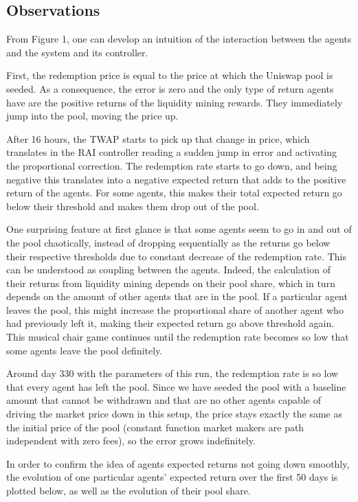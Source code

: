 \documentclass{article}
\begin{document}
    \subsection{Observations}

    From Figure 1, one can develop an intuition of the interaction between the agents and the system and its controller. 
    
    First, the redemption price is equal to the price at which the Uniswap pool is seeded. As a consequence, the error is zero and the only type of return agents have are the positive returns of the liquidity mining rewards. They immediately jump into the pool, moving the price up. 
    
    After 16 hours, the TWAP starts to pick up that change in price, which translates in the RAI controller reading a sudden jump in error and activating the proportional correction. The redemption rate starts to go down, and being negative this translates into a negative expected return that adds to the positive return of the agents. For some agents, this makes their total expected return go below their threshold and makes them drop out of the pool. 

    One surprising feature at first glance is that some agents seem to go in and out of the pool chaotically, instead of dropping sequentially as the returns go below their respective thresholds due to constant decrease of the redemption rate. This can be understood as coupling between the agents. Indeed, the calculation of their returns from liquidity mining depends on their pool share, which in turn depends on the amount of other agents that are in the pool. If a particular agent leaves the pool, this might increase the proportional share of another agent who had previously left it, making their expected return go above threshold again. This musical chair game continues until the redemption rate becomes so low that some agents leave the pool definitely. 
    
    Around day 330 with the parameters of this run, the redemption rate is so low that every agent has left the pool. Since we have seeded the pool with a baseline amount that cannot be withdrawn and that are no other agents capable of driving the market price down in this setup, the price stays exactly the same as the initial price of the pool (constant function market makers are path independent with zero fees), so the error grows indefinitely. 

    In order to confirm the idea of agents expected returns not going down smoothly, the evolution of one particular agents' expected return over the first 50 days is plotted below, as well as the evolution of their pool share.
\end{document}
